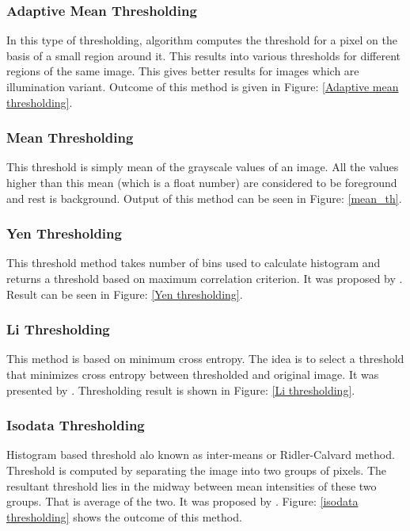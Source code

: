\documentclass[11pt]{article}
\begin{document}
\subsubsection{Adaptive Mean Thresholding}
In this type of thresholding, algorithm computes the threshold for a pixel on the basis of a small region around it. This results into various thresholds for different regions of the same image. This gives better results for images which are illumination variant. Outcome of this method is given in Figure: \ref{Adaptive mean thresholding}.

\subsubsection{Mean Thresholding}
This threshold is simply mean of the grayscale values of an image. All the values higher than this mean (which is a float number) are considered to be foreground and rest is background. Output of this method can be seen in Figure: \ref{mean_th}.

\subsubsection{Yen Thresholding}
This threshold method takes number of bins used to calculate histogram and returns a threshold based on maximum correlation criterion. It was proposed by \cite{yen1995new}. Result can be seen in Figure: \ref{Yen thresholding}.

\subsubsection{Li Thresholding}
This method is based on minimum cross entropy. The idea is to select a threshold that minimizes cross entropy between thresholded and original image. It was presented by \cite{li1993minimum}. Thresholding result is shown in Figure: \ref{Li thresholding}.

\subsubsection{Isodata Thresholding}
Histogram based threshold alo known as inter-means or Ridler-Calvard method. Threshold is computed by separating the image into two groups of pixels. The resultant threshold lies in the midway between mean intensities of these two groups. That is average of the two. It was proposed by \cite{ridler1978picture}. Figure: \ref{isodata thresholding} shows the outcome of this method.
\end{document}
